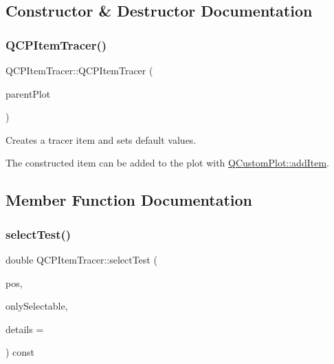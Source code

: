 \subsection{Constructor \& Destructor Documentation}
\hypertarget{class_q_c_p_item_tracer_adc5ca846eeac323db4aa1fc4081e36be}{}\label{class_q_c_p_item_tracer_adc5ca846eeac323db4aa1fc4081e36be} 
\subsubsection{\texorpdfstring{Q\+C\+P\+Item\+Tracer()}{QCPItemTracer()}}
{\footnotesize\ttfamily Q\+C\+P\+Item\+Tracer\+::\+Q\+C\+P\+Item\+Tracer (\begin{DoxyParamCaption}\item[{\hyperlink{class_q_custom_plot}{Q\+Custom\+Plot} $\ast$}]{parent\+Plot }\end{DoxyParamCaption})}

Creates a tracer item and sets default values.

The constructed item can be added to the plot with \hyperlink{class_q_custom_plot_aa500620379262321685cb7a7674cbd2a}{Q\+Custom\+Plot\+::add\+Item}. 

\subsection{Member Function Documentation}
\hypertarget{class_q_c_p_item_tracer_ae1dc728384936184e7552a6d0d67fd75}{}\label{class_q_c_p_item_tracer_ae1dc728384936184e7552a6d0d67fd75} 
\subsubsection{\texorpdfstring{select\+Test()}{selectTest()}}
{\footnotesize\ttfamily double Q\+C\+P\+Item\+Tracer\+::select\+Test (\begin{DoxyParamCaption}\item[{const Q\+PointF \&}]{pos,  }\item[{bool}]{only\+Selectable,  }\item[{Q\+Variant $\ast$}]{details = {} }\end{DoxyParamCaption}) const\hspace{0.3cm}{\ttfamily [virtual]}}

